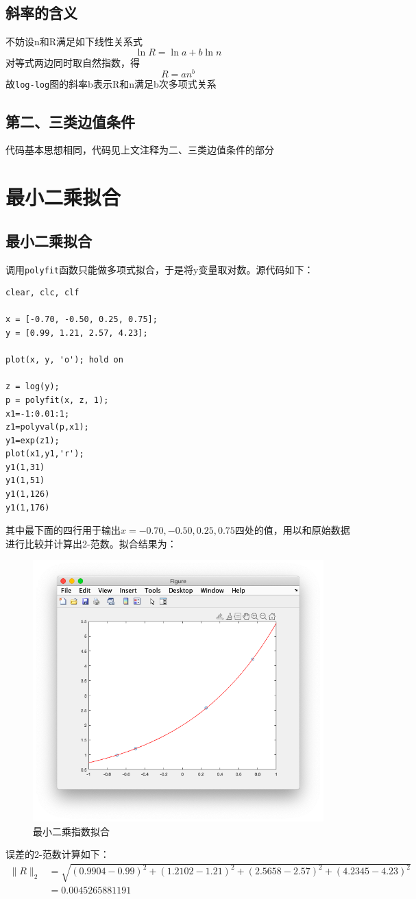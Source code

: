 \documentclass[]{report}
\begin{document}
		\subsection{斜率的含义}
			不妨设n和R满足如下线性关系式
			\[\ln R=\ln a+b\ln n\]
			对等式两边同时取自然指数，得
			\[R=an^b\]
			故\verb|log-log|图的斜率b表示R和n满足b次多项式关系
		\subsection{第二、三类边值条件}
		代码基本思想相同，代码见上文注释为二、三类边值条件的部分

	\section{最小二乘拟合}
		\subsection{最小二乘拟合}
		调用\verb|polyfit|函数只能做多项式拟合，于是将y变量取对数。源代码如下：
		\begin{lstlisting}
clear, clc, clf

x = [-0.70, -0.50, 0.25, 0.75];
y = [0.99, 1.21, 2.57, 4.23];

plot(x, y, 'o'); hold on

z = log(y);
p = polyfit(x, z, 1);
x1=-1:0.01:1;
z1=polyval(p,x1);
y1=exp(z1);
plot(x1,y1,'r');
y1(1,31)
y1(1,51)
y1(1,126)
y1(1,176)
		\end{lstlisting}
		其中最下面的四行用于输出$x=-0.70,-0.50,0.25,0.75$四处的值，用以和原始数据进行比较并计算出2-范数。拟合结果为：\par
		\begin{figure}[h!]
			\centering
			\begin{minipage}{40em}
				\centering
				\includegraphics[scale = 0.35]{images/1_3.png}
				\caption{最小二乘指数拟合}
			\end{minipage}
		\end{figure}
		误差的2-范数计算如下：
		\[\begin{aligned}
			\parallel R\parallel_2&=\sqrt{(0.9904-0.99)^2+(1.2102-1.21)^2+(2.5658-2.57)^2+(4.2345-4.23)^2}\\
			&=0.0045265881191
		\end{aligned}\]
\end{document}
